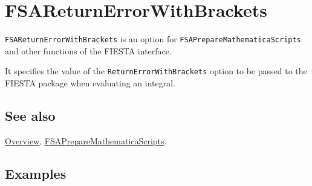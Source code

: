 \documentclass[../FeynHelpersManual.tex]{subfiles}
\begin{document}
\hypertarget{fsareturnerrorwithbrackets}{
\section{FSAReturnErrorWithBrackets}\label{fsareturnerrorwithbrackets}}

\texttt{FSAReturnErrorWithBrackets} is an option for
\texttt{FSAPrepareMathematicaScripts} and other functions of the FIESTA
interface.

It specifies the value of the \texttt{ReturnErrorWithBrackets} option to
be passed to the FIESTA package when evaluating an integral.

\subsection{See also}

\hyperlink{toc}{Overview},
\hyperlink{fsapreparemathematicascripts}{FSAPrepareMathematicaScripts}.

\subsection{Examples}
\end{document}
